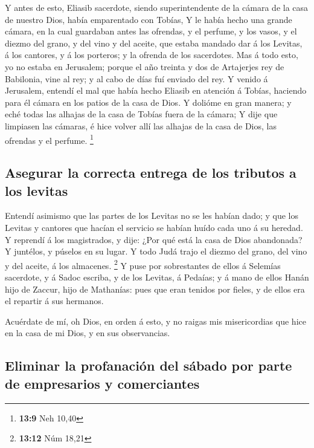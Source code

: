  Y antes de esto, Eliasib sacerdote, siendo
superintendente de la cámara de la casa de nuestro Dios, había
emparentado con Tobías,  Y le había hecho una grande
cámara, en la cual guardaban antes las ofrendas, y el perfume, y los
vasos, y el diezmo del grano, y del vino y del aceite, que estaba
mandado dar á los Levitas, á los cantores, y á los porteros; y la
ofrenda de los sacerdotes.  Mas á todo esto, yo no estaba
en Jerusalem; porque el año treinta y dos de Artajerjes rey de
Babilonia, vine al rey; y al cabo de días fuí enviado del rey.
 Y venido á Jerusalem, entendí el mal que había hecho
Eliasib en atención á Tobías, haciendo para él cámara en los patios de
la casa de Dios.  Y dolióme en gran manera; y eché todas
las alhajas de la casa de Tobías fuera de la cámara;  Y
dije que limpiasen las cámaras, é hice volver allí las alhajas de la
casa de Dios, las ofrendas y el perfume. \footnote{\textbf{13:9} Neh
  10,40}

\hypertarget{asegurar-la-correcta-entrega-de-los-tributos-a-los-levitas}{%
\subsection{Asegurar la correcta entrega de los tributos a los
levitas}\label{asegurar-la-correcta-entrega-de-los-tributos-a-los-levitas}}

 Entendí asimismo que las partes de los Levitas no se les
habían dado; y que los Levitas y cantores que hacían el servicio se
habían huído cada uno á su heredad.  Y reprendí á los
magistrados, y dije: ¿Por qué está la casa de Dios abandonada? Y
juntélos, y púselos en su lugar.  Y todo Judá trajo el
diezmo del grano, del vino y del aceite, á los almacenes. \footnote{\textbf{13:12}
  Núm 18,21}  Y puse por sobrestantes de ellos á Selemías
sacerdote, y á Sadoc escriba, y de los Levitas, á Pedaías; y á mano de
ellos Hanán hijo de Zaccur, hijo de Mathanías: pues que eran tenidos por
fieles, y de ellos era el repartir á sus hermanos.

 Acuérdate de mí, oh Dios, en orden á esto, y no raigas
mis misericordias que hice en la casa de mi Dios, y en sus observancias.

\hypertarget{eliminar-la-profanaciuxf3n-del-suxe1bado-por-parte-de-empresarios-y-comerciantes}{%
\subsection{Eliminar la profanación del sábado por parte de empresarios
y
comerciantes}\label{eliminar-la-profanaciuxf3n-del-suxe1bado-por-parte-de-empresarios-y-comerciantes}}

